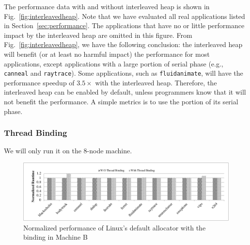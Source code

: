 The performance data with and without interleaved heap is shown in Fig.~\ref{fig:interleavedheap}. Note that we have evaluated all real applications listed in Section~\ref{sec:performance}. The applications that have no or little performance impact by the interleaved heap are omitted in this figure. From Fig.~\ref{fig:interleavedheap}, we have the following conclusion: the interleaved heap will benefit (or at least no harmful impact) the performance for most applications, except applications with a large portion of serial phase (e.g., \texttt{canneal} and \texttt{raytrace}). Some applications, such as \texttt{fluidanimate}, will have the performance speedup of $3.5\times$ with the interleaved heap. Therefore, the interleaved heap can be enabled by default, unless programmers know that it will not benefit the performance. A simple metrics is to use the portion of its serial phase. 



\subsubsection{Thread Binding}
\label{sec: threadbinding}

We will only run it on the 8-node machine.  

\begin{figure}[!h]
    \centering
    \includegraphics[width=\textwidth]{figure/WO-pthread-binding.pdf}
    \caption{Normalized performance of Linux's default allocator with the binding in Machine B}
    \label{binding-pthread-scalibity}
\end{figure}

